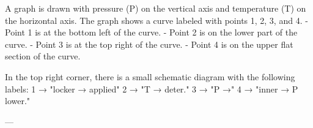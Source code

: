 A graph is drawn with pressure (P) on the vertical axis and temperature (T) on the horizontal axis. The graph shows a curve labeled with points 1, 2, 3, and 4.  
- Point 1 is at the bottom left of the curve.  
- Point 2 is on the lower part of the curve.  
- Point 3 is at the top right of the curve.  
- Point 4 is on the upper flat section of the curve.  

In the top right corner, there is a small schematic diagram with the following labels:  
1 → "locker → applied"  
2 → "T → deter."  
3 → "P →"  
4 → "inner → P lower."  

---